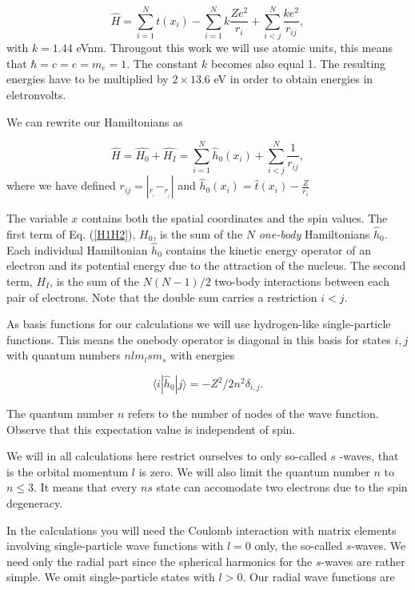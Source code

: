 \documentclass[%
oneside,                 %
final,                   %
10pt]{article}
\begin{document}
\begin{equation*}
  \hat{H} = \sum_{i=1}^{N} t(x_i) 
  - \sum_{i=1}^{N} k\frac{Ze^2}{r_i} + \sum_{i<j}^{N} \frac{ke^2}{r_{ij}},
\end{equation*}
with $k=1.44$ eVnm. Througout this work we will use atomic units, this means
that $\hbar=c=e=m_e=1$. The constant $k$ becomes also equal 1. 
The resulting energies have to be multiplied by $2\times 13.6$ eV
in order to obtain energies in eletronvolts.

We can rewrite our Hamiltonians as

\begin{equation}
    \hat{H} = \hat{H_0} + \hat{H_I} 
    = \sum_{i=1}^{N}\hat{h}_0(x_i) + \sum_{i<j}^{N}\frac{1}{r_{ij}},
\label{H1H2}
\end{equation}
where  we have defined $r_{ij}=| _r__i-_r__j|$ and
$\hat{h}_0(x_i) =  \hat{t}(x_i) - \frac{Z}{r_i}$

The variable $x$ contains both the spatial coordinates and the spin
values.  The first term of Eq. (\ref{H1H2}), $H_0$, is the sum of the
$N$ \emph{one-body} Hamiltonians $\hat{h}_0$. Each individual Hamiltonian
$\hat{h}_0$ contains the kinetic energy operator of an electron and
its potential energy due to the attraction of the nucleus. The second
term, $H_I$, is the sum of the $N(N-1)/2$ two-body interactions
between each pair of electrons. Note that the double sum carries a
restriction $i<j$.

As basis functions for our calculations we will use hydrogen-like
single-particle functions.  This means the onebody operator is
diagonal in this basis for states $i,j$ with quantum numbers
$nlm_lsm_s$ with energies

\begin{equation*}\langle i|\hat{h}_0| j\rangle =  -Z^2/2n^2\delta_{i,j}.\end{equation*}

The quantum number $n$ refers to the number of nodes of the wave
function.  Observe that this expectation value is independent of spin.

We will in all calculations here restrict ourselves to only so-called
$s$ -waves, that is the orbital momentum $l$ is zero. We will also
limit the quantum number $n$ to $n\le 3$.  It means that every $ns$
state can accomodate two electrons due to the spin degeneracy.

In the calculations you will need the Coulomb interaction with matrix
elements involving single-particle wave functions with $l=0$ only, the
so-called $s$-waves.  We need only the radial part since the spherical
harmonics for the $s$-waves are rather simple. We omit single-particle
states with $l> 0$.  Our radial wave functions are
\end{document}
